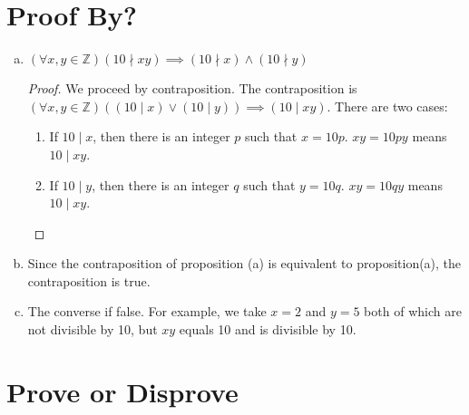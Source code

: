 \documentclass{article}
\begin{document}
\section{Proof By?}

\begin{enumerate}[(a)]
    \item $(\forall x, y \in \mathbb{Z}) (10 \nmid xy) \implies (10 \nmid x) \land (10 \nmid y)$
    
    \begin{proof}
    We proceed by contraposition. The contraposition is $(\forall x, y \in \mathbb{Z}) \left( (10 \mid x) \lor (10 \mid y) \right) \implies (10 \mid xy)$. There are two cases:
    \begin{enumerate}[(1)]
        \item If $10 \mid x$, then there is an integer $p$ such that $x = 10p$. $xy = 10py$ means $10 \mid xy$.
        \item If $10 \mid y$, then there is an integer $q$ such that $y = 10q$. $xy = 10qy$ means $10 \mid xy$.
    \end{enumerate}
    \end{proof}
    
    \item Since the contraposition of proposition (a) is equivalent to proposition(a), the contraposition is true.
    
    \item The converse if false. For example, we take $x = 2$ and $y = 5$ both of which are not divisible by 10, but $xy$ equals 10 and is divisible by 10.
\end{enumerate}

\section{Prove or Disprove}
\end{document}
